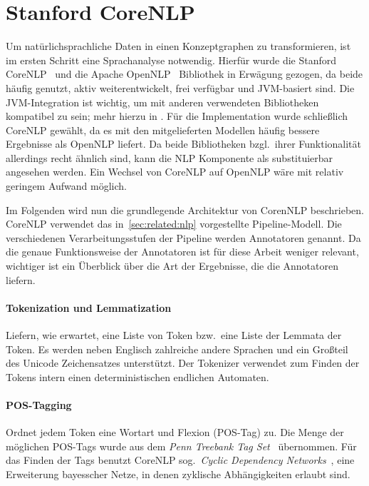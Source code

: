 \section{Stanford CoreNLP}%
\label{sec:theory:nlp}

Um natürlichsprachliche Daten in einen Konzeptgraphen zu transformieren, ist im ersten Schritt eine Sprachanalyse notwendig.
Hierfür wurde die Stanford CoreNLP~\cite{CoreNLP} und die Apache OpenNLP~\cite{OpenNLP} Bibliothek in Erwägung gezogen, da beide häufig genutzt, aktiv weiterentwickelt, frei verfügbar und JVM-basiert sind.
Die JVM-Integration ist wichtig, um mit anderen verwendeten Bibliotheken kompatibel zu sein;
mehr hierzu in .
Für die Implementation wurde schließlich CoreNLP gewählt, da es mit den mitgelieferten Modellen häufig bessere Ergebnisse als OpenNLP liefert.
Da beide Bibliotheken bzgl.\ ihrer Funktionalität allerdings recht ähnlich sind, kann die NLP Komponente als substituierbar angesehen werden.
Ein Wechsel von CoreNLP auf OpenNLP wäre mit relativ geringem Aufwand möglich.

Im Folgenden wird nun die grundlegende Architektur von CorenNLP beschrieben.
CoreNLP verwendet das in~\ref{sec:related:nlp} vorgestellte Pipeline-Modell.
Die verschiedenen Verarbeitungsstufen der Pipeline werden Annotatoren genannt.
Da die genaue Funktionsweise der Annotatoren ist für diese Arbeit weniger relevant, wichtiger ist ein Überblick über die Art der Ergebnisse, die die Annotatoren liefern.

\paragraph{Tokenization und Lemmatization}
Liefern, wie erwartet, eine Liste von Token bzw.\ eine Liste der Lemmata der Token.
Es werden neben Englisch zahlreiche andere Sprachen und ein Großteil des Unicode Zeichensatzes unterstützt.
Der Tokenizer verwendet zum Finden der Tokens intern einen deterministischen endlichen Automaten.

\paragraph{POS-Tagging}
Ordnet jedem Token eine Wortart und Flexion (POS-Tag) zu.
Die Menge der möglichen POS-Tags wurde aus dem \textit{Penn Treebank Tag Set}~\cite{Santorini1990} übernommen.
Für das Finden der Tags benutzt CoreNLP sog.\ \textit{Cyclic Dependency Networks}~\cite{Toutanova2003}, eine Erweiterung bayesscher Netze, in denen zyklische Abhängigkeiten erlaubt sind.


